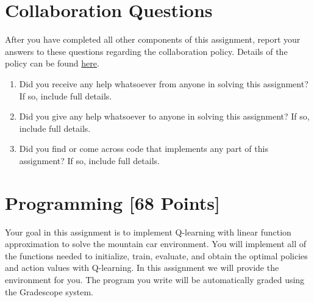 \documentclass[11pt,addpoints,answers]{exam}
\begin{document}
\begin{questions}

    \clearpage
    \end{questions}
\newpage
\newpage
\section{Collaboration Questions}
After you have completed all other components of this assignment, report your answers to these questions regarding the collaboration policy. Details of the policy can be found \href{http://www.cs.cmu.edu/~mgormley/courses/10601/syllabus.html}{here}.
\begin{enumerate}
    \item Did you receive any help whatsoever from anyone in solving this assignment? If so, include full details.
    \item Did you give any help whatsoever to anyone in solving this assignment? If so, include full details.
    \item Did you find or come across code that implements any part of this assignment? If so, include full details.
\end{enumerate}

\begin{your_solution}[height=6cm]

\end{your_solution}
\newpage
\section{Programming [68 Points]}
\label{sec:code}

Your goal in this assignment is to implement Q-learning with linear function approximation to solve the mountain car environment. You will implement all of the functions needed to initialize, train, evaluate, and obtain the optimal policies and action values with Q-learning. In this assignment we will provide the environment for you. The program you write will be automatically graded using the Gradescope system.
\end{document}
